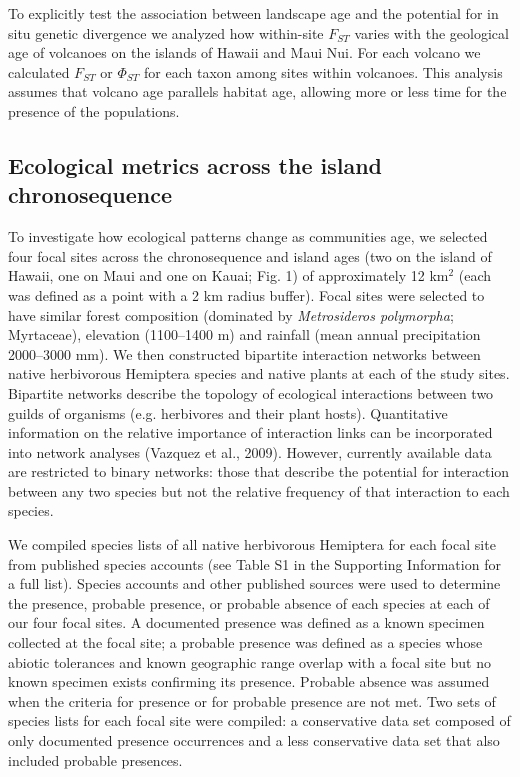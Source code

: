 To explicitly test the association between landscape age and the
potential for in situ genetic divergence we analyzed how within-site
$F_{ST}$ varies with the geological age of volcanoes on the islands of
Hawaii and Maui Nui. For each volcano we calculated $F_{ST}$ or
$\Phi_{ST}$ \citep{arlequin} for each taxon among sites within
volcanoes. This analysis assumes that volcano age parallels habitat
age, allowing more or less time for the presence of the populations.


\subsection{Ecological metrics across the island chronosequence}

To investigate how ecological patterns change as communities age, we
selected four focal sites across the chronosequence and island ages
(two on the island of Hawaii, one on Maui and one on Kauai; Fig. 1) of
approximately 12 km$^2$ (each was defined as a point with a 2 km
radius buffer). Focal sites were selected to have similar forest
composition (dominated by \textit{Metrosideros polymorpha};
Myrtaceae), elevation (1100--1400 m) and rainfall (mean annual
precipitation 2000--3000 mm). We then constructed bipartite
interaction networks between native herbivorous Hemiptera species and
native plants at each of the study sites. Bipartite networks describe
the topology of ecological interactions between two guilds of
organisms (e.g. herbivores and their plant hosts). Quantitative
information on the relative importance of interaction links can be
incorporated into network analyses (Vazquez et al., 2009). However,
currently available data are restricted to binary networks: those that
describe the potential for interaction between any two species but not
the relative frequency of that interaction to each species.

We compiled species lists of all native herbivorous Hemiptera for each
focal site from published species accounts (see Table S1 in the
Supporting Information for a full list). Species accounts and other
published sources were used to determine the presence, probable
presence, or probable absence of each species at each of our four
focal sites. A documented presence was defined as a known specimen
collected at the focal site; a probable presence was defined as a
species whose abiotic tolerances and known geographic range overlap
with a focal site but no known specimen exists confirming its
presence. Probable absence was assumed when the criteria for presence
or for probable presence are not met. Two sets of species lists for
each focal site were compiled: a conservative data set composed of
only documented presence occurrences and a less conservative data set
that also included probable presences.

